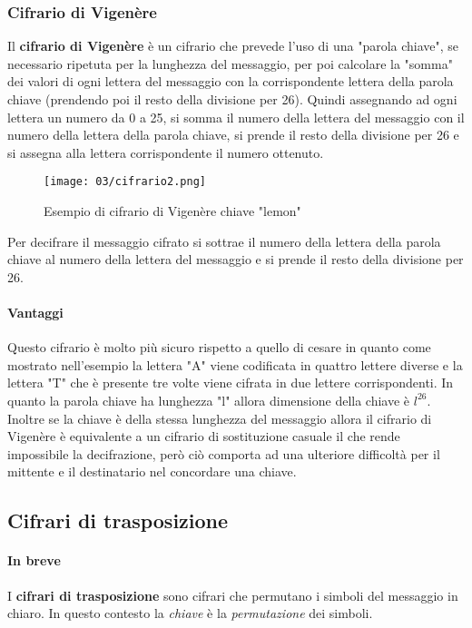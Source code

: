         \subsubsection{Cifrario di Vigenère}
            Il \textbf{cifrario di Vigenère} è un cifrario che prevede l'uso di una "parola chiave", se necessario ripetuta per la lunghezza del messaggio, per poi calcolare la "somma" dei valori di ogni lettera del messaggio con la corrispondente lettera della parola chiave (prendendo poi il resto della divisione per 26). Quindi assegnando ad ogni lettera un numero da 0 a 25, si somma il numero della lettera del messaggio con il numero della lettera della parola chiave, si prende il resto della divisione per 26 e si assegna alla lettera corrispondente il numero ottenuto.
            \begin{figure}[H]
                \centering
                \texttt{[image: 03/cifrario2.png]}
                \caption{Esempio di cifrario di Vigenère chiave "lemon"}
            \end{figure}
            Per decifrare il messaggio cifrato si sottrae il numero della lettera della parola chiave al numero della lettera del messaggio e si prende il resto della divisione per 26.
            \paragraph{Vantaggi} Questo cifrario è molto più sicuro rispetto a quello di cesare in quanto come mostrato nell'esempio la lettera "A" viene codificata in quattro lettere diverse e la lettera "T" che è presente tre volte viene cifrata in due lettere corrispondenti. In quanto la parola chiave ha lunghezza "l" allora dimensione della chiave è $l^{26}$. Inoltre se la chiave è della stessa lunghezza del messaggio allora il cifrario di Vigenère è equivalente a un cifrario di sostituzione casuale il che rende impossibile la decifrazione, però ciò comporta ad una ulteriore difficoltà per il mittente e il destinatario nel concordare una chiave.
    \subsection{Cifrari di trasposizione}
        \paragraph{In breve} I \textbf{cifrari di trasposizione} sono cifrari che permutano i simboli del messaggio in chiaro. In questo contesto la \textit{chiave} è la \textit{permutazione} dei simboli.
